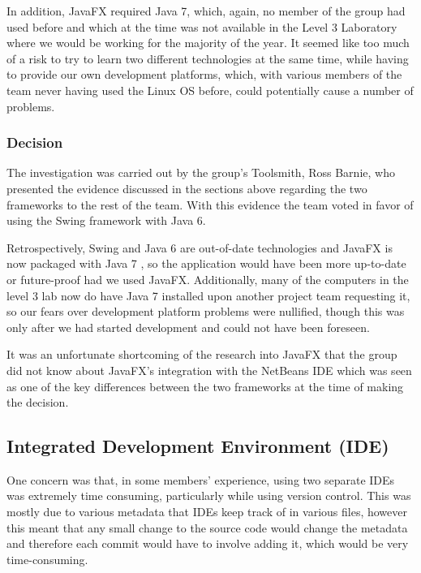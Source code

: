 In addition, JavaFX required Java 7, which, again, no member of the
group had used before and which at the time was not available in the
Level 3 Laboratory where we would be working for the majority of the
year.
It seemed like too much of a risk to try to learn two different
technologies at the same time, while having to provide our own
development platforms, which, with various members of the team never
having used the Linux OS before, could potentially cause a number of
problems.


\subsubsection{Decision}
\label{impl:ui:guiframework:decision}

The investigation was carried out by the group's Toolsmith, Ross
Barnie, who presented the evidence discussed in the sections above
regarding the two frameworks to the rest of the team.
With this evidence the team voted in favor of using the Swing
framework with Java 6.

Retrospectively, Swing and Java 6 are out-of-date technologies and
JavaFX is now packaged with Java 7 \cite{javafxOverview}, so the
application would have been more up-to-date or future-proof had we
used JavaFX.
Additionally, many of the computers in the level 3 lab now do have
Java 7 installed upon another project team requesting it, so our fears
over development platform problems were nullified, though this was
only after we had started development and could not have been foreseen.

It was an unfortunate shortcoming of the research into JavaFX that the
group did not know about JavaFX's integration with the NetBeans IDE
which was seen as one of the key differences between the two
frameworks at the time of making the decision.


\subsection{Integrated Development Environment (IDE)}
\label{impl:ui:ide}

One concern was that, in some members' experience, using two separate
IDEs was extremely time consuming, particularly while using version
control.
This was mostly due to various metadata that IDEs keep track of in
various files, however this meant that any small change to the source
code would change the metadata and therefore each commit would have to
involve adding it, which would be very time-consuming.

